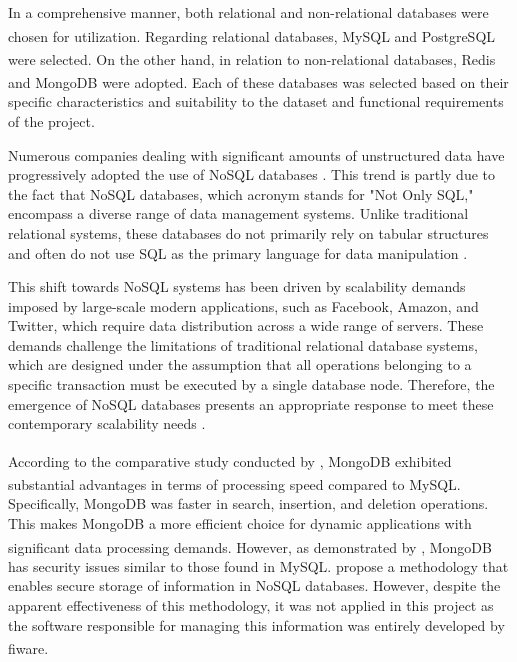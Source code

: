 In a comprehensive manner, both relational and non-relational databases were chosen for utilization. Regarding relational databases, MySQL\textsuperscript{\textregistered} \cite{mysql_ab_mysql_2023} and PostgreSQL\textsuperscript{\textregistered} \cite{postgresql_global_postgresql_2023} were selected. On the other hand, in relation to non-relational databases, Redis\textsuperscript{\textregistered}\cite{redis_redis_2023} and MongoDB\textsuperscript{\textregistered} \cite{mongodb_inc_d2023} were adopted. Each of these databases was selected based on their specific characteristics and suitability to the dataset and functional requirements of the project.

Numerous companies dealing with significant amounts of unstructured data have progressively adopted the use of NoSQL databases \cite{Leavitt2010}. This trend is partly due to the fact that NoSQL databases, which acronym stands for "Not Only SQL," encompass a diverse range of data management systems. Unlike traditional relational systems, these databases do not primarily rely on tabular structures and often do not use SQL as the primary language for data manipulation \cite{moniruzzaman2013nosql}.

This shift towards NoSQL systems has been driven by scalability demands imposed by large-scale modern applications, such as Facebook, Amazon, and Twitter, which require data distribution across a wide range of servers. These demands challenge the limitations of traditional relational database systems, which are designed under the assumption that all operations belonging to a specific transaction must be executed by a single database node. Therefore, the emergence of NoSQL databases presents an appropriate response to meet these contemporary scalability needs \cite{moniruzzaman2013nosql}.

According to the comparative study conducted by \textcite{Cornelia2015}, MongoDB\textsuperscript{\textregistered} exhibited substantial advantages in terms of processing speed compared to MySQL\textsuperscript{\textregistered}. Specifically, MongoDB was faster in search, insertion, and deletion operations. This makes MongoDB a more efficient choice for dynamic applications with significant data processing demands. However, as demonstrated by \textcite{ron2015no}, MongoDB\textsuperscript{\textregistered} has security issues similar to those found in MySQL. \textcite{Kumar2017} propose a methodology that enables secure storage of information in NoSQL databases. However, despite the apparent effectiveness of this methodology, it was not applied in this project as the software responsible for managing this information was entirely developed by \acrshort{fiware}\textsuperscript{\textregistered}.



